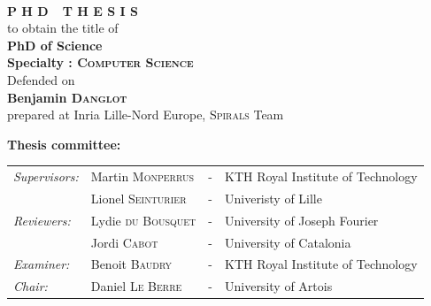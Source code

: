 \begin{titlepage}
\begin{center}
\vspace*{0.9cm}
 \\
\vspace*{0.9cm}
\vspace*{0.5cm}
\noindent \Huge \textbf{P H D\ \ T H E S I S} \\
\vspace*{0.3cm}
\noindent \large {to obtain the title of} \\
\vspace*{0.3cm}
\noindent \LARGE \textbf{PhD of Science} \\
\vspace*{0.3cm}
\noindent \Large \textbf{Specialty : \textsc{Computer Science}}\\
\vspace*{0.4cm}
\noindent \large {Defended on \\}
\noindent \LARGE \textbf{Benjamin \textsc{Danglot}} \\
\vspace*{0.9cm}
\noindent \Large prepared at Inria Lille-Nord Europe, \textsc{Spirals} Team\\
\vspace*{0.5cm}
\end{center}
\noindent \large \textbf{Thesis committee:} \\
\begin{center}
\noindent \large 
\begin{tabular}{llcl}
      \textit{Supervisors:}	& Martin \textsc{Monperrus}	& - & KTH Royal Institute of Technology \\
      & Lionel \textsc{Seinturier}	& - & Univeristy of Lille \\
      \textit{Reviewers:} & Lydie \textsc{du Bousquet} & - & University of Joseph Fourier \\
      & Jordi \textsc{Cabot} & - & University of Catalonia \\
      \textit{Examiner:} & Benoit \textsc{Baudry} & - &  KTH Royal Institute of Technology\\
      \textit{Chair:} & Daniel \textsc{Le Berre} & - & University of Artois \\
\end{tabular}
\end{center}
\end{titlepage}
\sloppy

\titlepage
